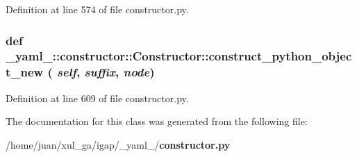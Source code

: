 Definition at line 574 of file constructor.py.
\subsubsection{\setlength{\rightskip}{0pt plus 5cm}def \_\-yaml\_\-::constructor::Constructor::construct\_\-python\_\-object\_\-new ( {\em self},  {\em suffix},  {\em node})}\label{class__yaml___1_1constructor_1_1Constructor_00e57e9b32c0475b5729dcf8294db147}




Definition at line 609 of file constructor.py.

The documentation for this class was generated from the following file:\begin{CompactItemize}
\item 
/home/juan/xul\_\-ga/igap/\_\-yaml\_\-/{\bf constructor.py}\end{CompactItemize}
